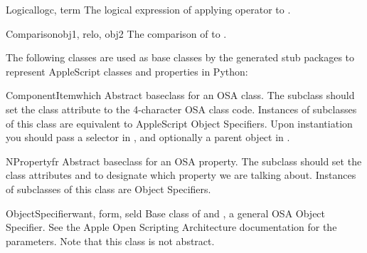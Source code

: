 \begin{classdesc}{Logical}{logc, term}
The logical expression of applying operator  to
.
\end{classdesc}

\begin{classdesc}{Comparison}{obj1, relo, obj2}
The comparison  of  to .
\end{classdesc}

The following classes are used as base classes by the generated stub
packages to represent AppleScript classes and properties in Python:

\begin{classdesc}{ComponentItem}{which}
Abstract baseclass for an OSA class. The subclass should set the class
attribute  to the 4-character OSA class code. Instances of
subclasses of this class are equivalent to AppleScript Object
Specifiers. Upon instantiation you should pass a selector in
, and optionally a parent object in .
\end{classdesc}

\begin{classdesc}{NProperty}{fr}
Abstract baseclass for an OSA property. The subclass should set the class
attributes  and  to designate which property we
are talking about. Instances of subclasses of this class are Object
Specifiers.
\end{classdesc}

\begin{classdesc}{ObjectSpecifier}{want, form, seld}
Base class of  and , a general
OSA Object Specifier. See the Apple Open Scripting Architecture
documentation for the parameters. Note that this class is not abstract.
\end{classdesc}

